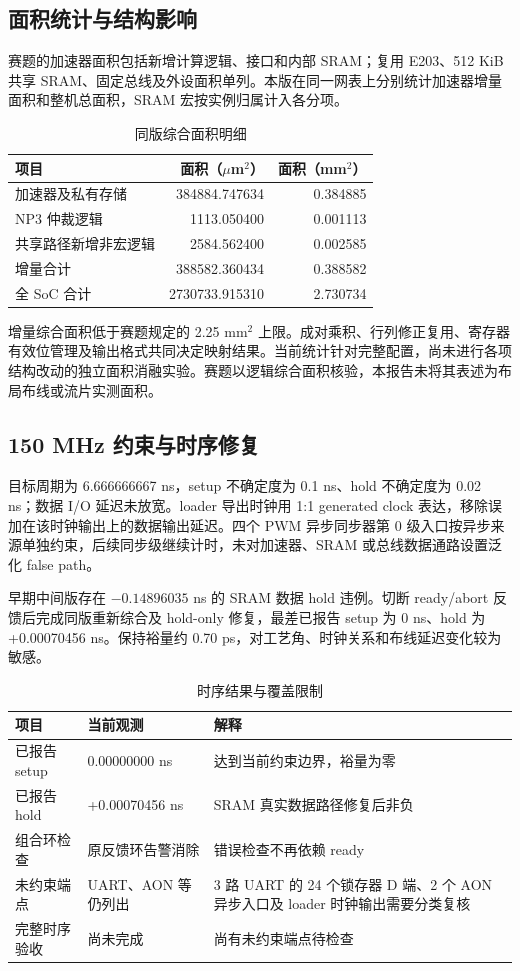 \documentclass[UTF8,punct,fontset=none,zihao=-4]{ctexart}
\begin{document}
\subsection{面积统计与结构影响}
赛题的加速器面积包括新增计算逻辑、接口和内部 SRAM；复用 E203、512 KiB 共享 SRAM、固定总线及外设面积单列。本版在同一网表上分别统计加速器增量面积和整机总面积，SRAM 宏按实例归属计入各分项。

\begin{table}[H]\centering
\caption{同版综合面积明细}
\begin{tabularx}{\linewidth}{Yrr}\toprule
项目 & 面积（$\mu$m$^2$） & 面积（mm$^2$）\\\midrule
加速器及私有存储 & 384884.747634 & 0.384885\\
NP3 仲裁逻辑 & 1113.050400 & 0.001113\\
共享路径新增非宏逻辑 & 2584.562400 & 0.002585\\\midrule
增量合计 & 388582.360434 & 0.388582\\
全 SoC 合计 & 2730733.915310 & 2.730734\\
\bottomrule\end{tabularx}
\end{table}

增量综合面积低于赛题规定的 2.25 mm$^2$ 上限。成对乘积、行列修正复用、寄存器有效位管理及输出格式共同决定映射结果。当前统计针对完整配置，尚未进行各项结构改动的独立面积消融实验。赛题以逻辑综合面积核验，本报告未将其表述为布局布线或流片实测面积。

\subsection{150 MHz 约束与时序修复}
目标周期为 6.666666667 ns，setup 不确定度为 0.1 ns、hold 不确定度为 0.02 ns；数据 I/O 延迟未放宽。loader 导出时钟用 1:1 generated clock 表达，移除误加在该时钟输出上的数据输出延迟。四个 PWM 异步同步器第 0 级入口按异步来源单独约束，后续同步级继续计时，未对加速器、SRAM 或总线数据通路设置泛化 false path。

早期中间版存在 $-0.14896035$ ns 的 SRAM 数据 hold 违例。切断 ready/abort 反馈后完成同版重新综合及 hold-only 修复，最差已报告 setup 为 0 ns、hold 为 +0.00070456 ns。保持裕量约 0.70 ps，对工艺角、时钟关系和布线延迟变化较为敏感。

\begin{table}[H]\centering\small
\caption{时序结果与覆盖限制}
\begin{tabularx}{\linewidth}{p{37mm}p{35mm}Y}\toprule
项目 & 当前观测 & 解释\\\midrule
已报告 setup & 0.00000000 ns & 达到当前约束边界，裕量为零\\
已报告 hold & +0.00070456 ns & SRAM 真实数据路径修复后非负\\
组合环检查 & 原反馈环告警消除 & 错误检查不再依赖 ready\\
未约束端点 & UART、AON 等仍列出 & 3 路 UART 的 24 个锁存器 D 端、2 个 AON 异步入口及 loader 时钟输出需要分类复核\\
完整时序验收 & 尚未完成 & 尚有未约束端点待检查\\
\bottomrule\end{tabularx}
\end{table}
\end{document}
